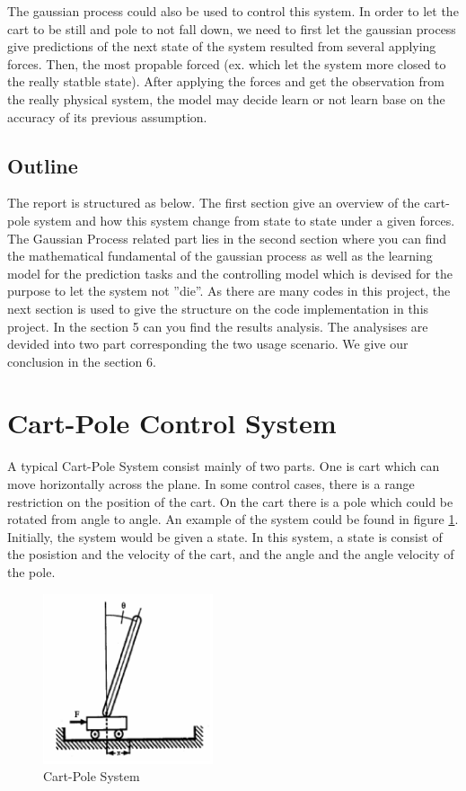 \documentclass[11pt,twoside,a4paper]{article}
\begin{document}
The gaussian process could also be used to control this system. In
order to let the cart to be still and pole to not fall down, we need
to first let the gaussian process give predictions of the next state
of the system resulted from several applying forces. Then, the most
propable forced (ex. which let the system more closed to the really
statble state). After applying the forces and get the observation from
the really physical system, the model may decide learn or not learn
 base on the accuracy of its previous assumption.\\ 

\subsection{Outline}

The report is structured as below. The first section give an overview
of the cart-pole system and how this system change from state to state
under a given forces. The Gaussian Process related part lies in the
second section where you can find the mathematical fundamental of the
gaussian process as well as the learning model for the prediction
tasks and the controlling model which is devised for the purpose to
let the system not ''die''. As there are many codes in this project,
the next section is used to give the structure on the code
implementation in this project. In the section 5 can you find
the results analysis. The analysises are devided into two part
corresponding the two usage scenario. We give our conclusion in the
section 6.\\ 

\section{Cart-Pole Control System}
A typical Cart-Pole System consist mainly of two parts. One is cart
which can move horizontally across the plane. In some control cases,
there is a range restriction on the position of the cart. On the cart
there is a pole which could be rotated from angle to angle. An example
of the system could be found in figure \ref{cart-pole}. Initially,
the system would be given a state. In this system, a state is consist
of the posistion and the velocity of the cart, and the angle and the
angle velocity of the pole.\\

\begin{figure}[h!]
\begin{center}
\includegraphics[width=5cm]{cart-pole.png}
\caption{Cart-Pole System\cite{Brownlee2005}}
\label{cart-pole}
\end{center}
\end{figure}
\end{document}
